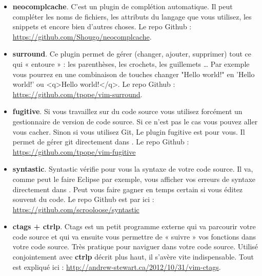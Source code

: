\begin{itemize}

    \item \textbf{neocomplcache}. C'est un plugin de complétion automatique. Il peut compléter les noms de fichiers, les attributs du langage que vous utilisez, les snippets et encore bien d'autres choses. Le repo Github : \url{https://github.com/Shougo/neocomplcache}.

    \item \textbf{surround}. Ce plugin permet de gérer (changer, ajouter, supprimer) tout ce qui « entoure » : les parenthèses, les crochets, les guillemets … Par exemple vous pourrez en une combinaison de touches changer "Hello world!" en 'Hello world!' ou <q>Hello world!</q>. Le repo Github : \url{https://github.com/tpope/vim-surround}.

    \item \textbf{fugitive}. Si vous travaillez sur du code source vous utilisez forcément un gestionnaire de version de code source. Si ce n'est pas le cas vous pouvez aller vous cacher. Sinon si vous utilisez Git, Le plugin fugitive est pour vous. Il permet de gérer git directement dans \vim. Le repo Github :  \url{https://github.com/tpope/vim-fugitive}

    \item \textbf{syntastic}. Syntastic vérifie pour vous la syntaxe de votre code source. Il va, comme peut le faire Eclipse par exemple, vous afficher vos erreurs de syntaxe directement dans \vim. Peut vous faire gagner en temps certain si vous éditez souvent du code. Le repo Github est par ici : \url{https://github.com/scrooloose/syntastic}

    \item \textbf{ctags + ctrlp}. Ctags est un petit programme externe qui va parcourir votre code source et qui va ensuite vous permettre de « suivre » vos fonctions dans votre code source. Très pratique pour naviguer dans votre code source. Utilisé conjointement avec \textbf{ctrlp} décrit plus haut, il s'avère vite indispensable. Tout est expliqué ici : \url{http://andrew-stewart.ca/2012/10/31/vim-ctags}.

\end{itemize}

